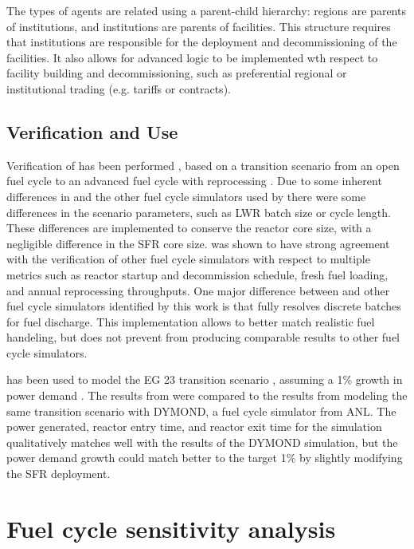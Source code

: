 The types of agents are related using a parent-child hierarchy: regions are
parents of institutions, and institutions are parents of facilities. This 
structure requires that institutions are responsible for the deployment 
and decommissioning of the facilities. It also allows for advanced logic 
to be implemented wth respect to facility building and decommissioning, 
such as preferential regional or institutional trading (e.g. tariffs or 
contracts). 

\subsection{Verification and Use}
Verification of \Cyclus has been performed \cite{bae_standardized_2019}, 
based on a transition scenario from an open fuel cycle to an advanced
fuel cycle with reprocessing \cite{feng_standardized_2016}. Due to 
some inherent differences in \Cyclus and the other fuel cycle simulators 
used by \cite{feng_standardized_2016} there were some differences in 
the scenario parameters, such as \gls{LWR} batch size or 
cycle length. These differences are implemented to conserve the reactor 
core size, with a negligible difference in the \gls{SFR} core size. \Cyclus 
was shown to have strong agreement with the verification of other 
fuel cycle simulators \cite{bae_standardized_2019} with respect to 
multiple metrics such as reactor startup and decommission schedule, fresh 
fuel loading, and annual reprocessing throughputs. One major difference
between \Cyclus and other fuel cycle simulators identified by this work 
is that \Cyclus fully resolves discrete batches for fuel discharge. This 
implementation allows \Cyclus to better match realistic fuel handeling, but 
does not prevent \Cyclus from producing comparable results to other 
fuel cycle simulators. 

\Cyclus has been used to model the EG 23 transition scenario 
\cite{wigeland_nuclear_2014}, assuming a 1\% growth in power demand 
\cite{djokic_application_2015}. The results from \Cyclus were compared 
to the results from modeling the same transition scenario with DYMOND, 
a fuel cycle simulator from \gls{ANL}. The power generated, reactor entry 
time, and reactor exit time for the \Cyclus simulation qualitatively 
matches well with the results of the DYMOND simulation, but the power 
demand growth could match better to the target 1\% by slightly modifying 
the \gls{SFR} deployment. 

\section{Fuel cycle sensitivity analysis}

